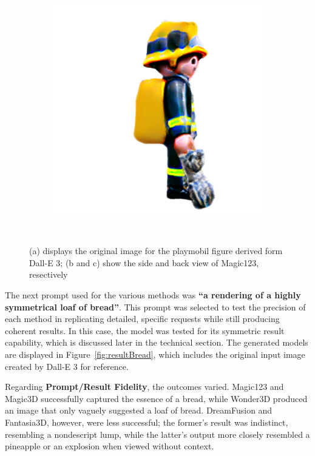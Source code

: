 \begin{figure}[ht]
\begin{subfigure}[b]{0.25\textwidth}
        \caption{}
    \end{subfigure}
    \begin{subfigure}[b]{0.25\textwidth}
        \centering
        \includegraphics[width=\textwidth]{etc/a high quality rendering of a playmobil firefighter/magic123/magic123_playmobil_coarse_right_10000_part1.png}
        \caption{}
    \end{subfigure}
    \caption{(a) displays the original image for the playmobil figure derived form Dall-E 3; (b and c) show the side and back view of Magic123, resectively}~\label{fig:inputPlaymobil}
\end{figure}

The next prompt used for the various methods was \textbf{``a rendering of a highly symmetrical loaf of bread''}. This prompt was selected to test the precision of each method in replicating detailed, specific requests while still producing coherent results. In this case, the model was tested for its symmetric result capability, which is discussed later in the technical section. The generated models are displayed in Figure~\ref{fig:resultBread}, which includes the original input image created by Dall-E 3 for reference.

Regarding \textbf{Prompt/Result Fidelity}, the outcomes varied. Magic123 and Magic3D successfully captured the essence of a bread, while Wonder3D produced an image that only vaguely suggested a loaf of bread. DreamFusion and Fantasia3D, however, were less successful; the former's result was indistinct, resembling a nondescript lump, while the latter's output more closely resembled a pineapple or an explosion when viewed without context.

